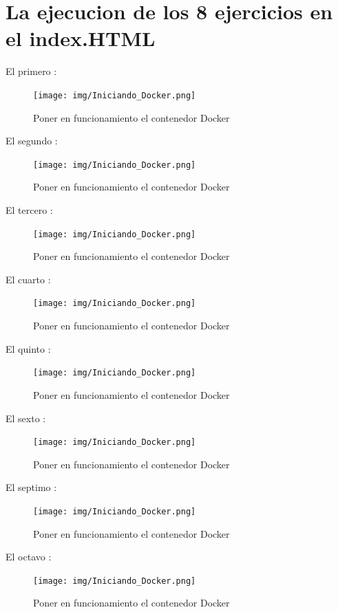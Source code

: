 \section{La ejecucion de los 8 ejercicios en el index.HTML}
El primero :
\begin{figure}[H]
  \centering
  \texttt{[image: img/Iniciando\_Docker.png]}
  \caption{Poner en funcionamiento el contenedor Docker}
\end{figure}
El segundo :
\begin{figure}[H]
  \centering
  \texttt{[image: img/Iniciando\_Docker.png]}
  \caption{Poner en funcionamiento el contenedor Docker}
\end{figure}
El tercero :
\begin{figure}[H]
  \centering
  \texttt{[image: img/Iniciando\_Docker.png]}
  \caption{Poner en funcionamiento el contenedor Docker}
\end{figure}
El cuarto :
\begin{figure}[H]
  \centering
  \texttt{[image: img/Iniciando\_Docker.png]}
  \caption{Poner en funcionamiento el contenedor Docker}
\end{figure}
El quinto :
\begin{figure}[H]
  \centering
  \texttt{[image: img/Iniciando\_Docker.png]}
  \caption{Poner en funcionamiento el contenedor Docker}
\end{figure}
El sexto :
\begin{figure}[H]
  \centering
  \texttt{[image: img/Iniciando\_Docker.png]}
  \caption{Poner en funcionamiento el contenedor Docker}
\end{figure}
El septimo :
\begin{figure}[H]
  \centering
  \texttt{[image: img/Iniciando\_Docker.png]}
  \caption{Poner en funcionamiento el contenedor Docker}
\end{figure}
El octavo :
\begin{figure}[H]
  \centering
  \texttt{[image: img/Iniciando\_Docker.png]}
  \caption{Poner en funcionamiento el contenedor Docker}
\end{figure}